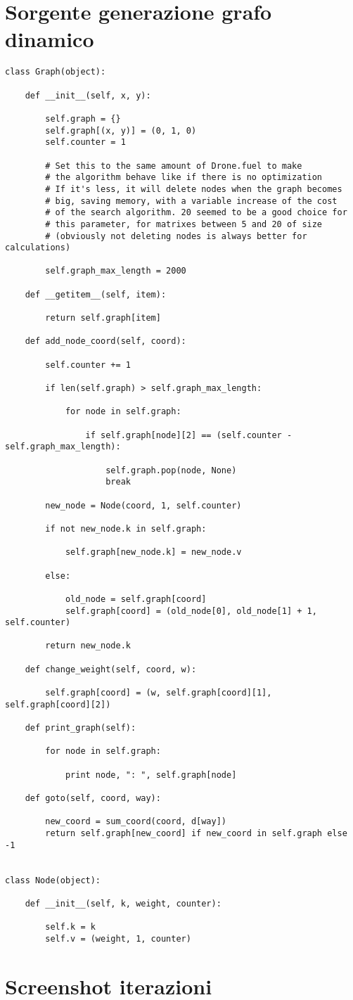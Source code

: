 \section{Sorgente generazione grafo dinamico}
\begin{verbatim}
class Graph(object):

    def __init__(self, x, y):

        self.graph = {}
        self.graph[(x, y)] = (0, 1, 0)
        self.counter = 1

        # Set this to the same amount of Drone.fuel to make
        # the algorithm behave like if there is no optimization
        # If it's less, it will delete nodes when the graph becomes
        # big, saving memory, with a variable increase of the cost
        # of the search algorithm. 20 seemed to be a good choice for
        # this parameter, for matrixes between 5 and 20 of size
        # (obviously not deleting nodes is always better for calculations)

        self.graph_max_length = 2000

    def __getitem__(self, item):

        return self.graph[item]

    def add_node_coord(self, coord):

        self.counter += 1

        if len(self.graph) > self.graph_max_length:

            for node in self.graph:

                if self.graph[node][2] == (self.counter - self.graph_max_length):

                    self.graph.pop(node, None)
                    break

        new_node = Node(coord, 1, self.counter)

        if not new_node.k in self.graph:

            self.graph[new_node.k] = new_node.v

        else:

            old_node = self.graph[coord]
            self.graph[coord] = (old_node[0], old_node[1] + 1, self.counter)

        return new_node.k

    def change_weight(self, coord, w):

        self.graph[coord] = (w, self.graph[coord][1], self.graph[coord][2])

    def print_graph(self):

        for node in self.graph:

            print node, ": ", self.graph[node]

    def goto(self, coord, way):

        new_coord = sum_coord(coord, d[way])
        return self.graph[new_coord] if new_coord in self.graph else -1


class Node(object):

    def __init__(self, k, weight, counter):
    
        self.k = k
        self.v = (weight, 1, counter)

\end{verbatim}
\section{Screenshot iterazioni}
	